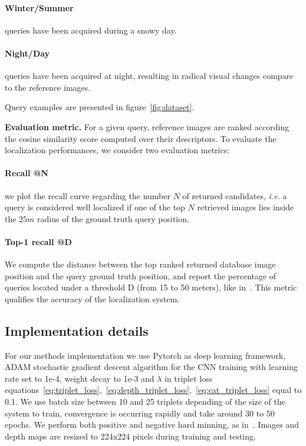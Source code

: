 	\paragraph{Winter/Summer} queries have been acquired during a snowy day.
	\paragraph{Night/Day} queries have been acquired at night, resulting in radical visual changes compare to the reference images.

Query examples are presented in figure~\ref{fig:dataset}.
	
\noindent\textbf{Evaluation metric.} For a given query, reference images are ranked according the cosine similarity score computed over their descriptors. To evaluate the localization performances, we consider two evaluation metrics:
	\setcounter{paragraph}{0}
	\paragraph{Recall @N} we plot the recall curve regarding the number $N$ of returned candidates, {\it i.e.} a query is considered well localized if one of the top $N$ retrieved images lies inside the $25m$ radius of the ground truth query position.
	\paragraph{Top-1 recall @D} We compute the distance between the top ranked returned database image position and the query ground truth position, and report the percentage of queries located under a threshold D (from 15 to 50 meters), like in~\cite{Zamir2014}. This metric qualifies the accuracy of the localization system.

\subsection{Implementation details}
\label{subsec:implementation}

For our methods implementation we use Pytorch as deep learning framework, ADAM stochastic gradient descent algorithm for the CNN training with learning rate set to 1e-4, weight decay to 1e-3 and $\lambda$ in triplet loss equations~\ref{eq:triplet_loss},~\ref{eq:depth_triplet_loss},~\ref{eq:cat_triplet_loss} equal to 0.1. We use batch size between 10 and 25 triplets depending of the size of the system to train, convergence is occurring rapidly and take around 30 to 50 epochs. We perform both positive and negative hard minning, as in~\cite{Radenovic2017}. Images and depth maps are resized to 224x224 pixels during training and testing.


